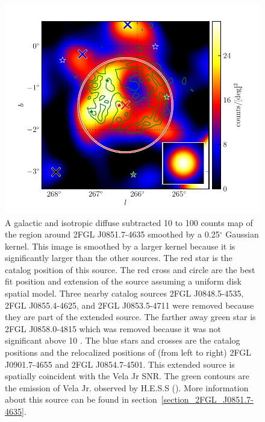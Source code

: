 \documentclass[12pt,preprint]{aastex}
\newcommand{\gev}{\text{GeV}\xspace}
\newcommand{\tev}{\text{TeV}\xspace}
\renewcommand{\deg}{\ensuremath{^\circ}\xspace}
\begin{document}
\begin{figure}
  \begin{center}
    \includegraphics[type=pdf,ext=.pdf,read=.pdf]{source_plots/source_Vela_Jr}
  \end{center}
  \caption{A galactic and isotropic diffuse subtracted 10 \gev to 100
  \gev counts map of the region around 2FGL J0851.7-4635 smoothed by
  a 0.25\deg Gaussian kernel. This image is smoothed by a larger
  kernel because it is significantly larger than the other sources.
  The red star is the catalog position of
  this source.  The red cross and circle are the best fit position
  and extension of the source assuming a uniform disk spatial model.
  Three nearby catalog sources 2FGL J0848.5-4535,
  2FGL J0855.4-4625, and 2FGL J0853.5-4711 were removed 
  because they are part of the extended source.  The farther away
  green star is 2FGL J0858.0-4815 which was removed 
  because it was not significant above 10 \gev.  The blue stars and
  crosses are the catalog positions and the relocalized positions of (from
  left to right) 2FGL J0901.7-4655 and 2FGL J0854.7-4501.  This
  extended source is spatially coincident with the Vela Jr SNR.
  The green contours are the \tev emission of Vela Jr. observed by
  H.E.S.S (\cite{vela_jr_hess}).  More information about this source 
  can be found in section~\ref{section_2FGL_J0851.7-4635}.
  }\label{Vela_Jr}
\end{figure}
\end{document}
